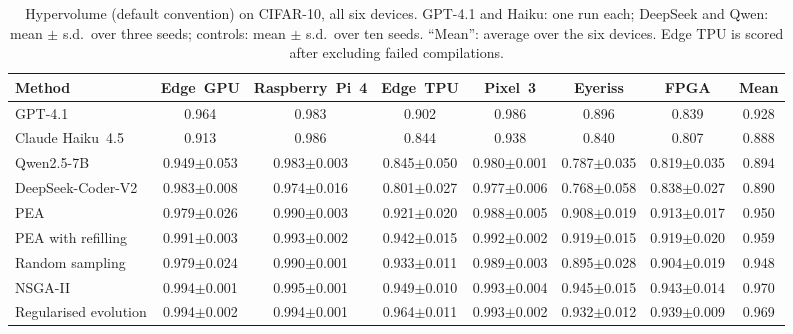 \documentclass[preprint,12pt]{elsarticle}
\begin{document}
\begin{table}[h]\centering\footnotesize
\caption{Hypervolume (default convention) on CIFAR-10, all six devices. GPT-4.1 and Haiku: one run each; DeepSeek and Qwen: mean $\pm$ s.d.\ over three seeds; controls: mean $\pm$ s.d.\ over ten seeds. ``Mean'': average over the six devices. Edge TPU is scored after excluding failed compilations.}\label{tab:multidevice}
\setlength{\tabcolsep}{2.5pt}
\begin{adjustbox}{max width=\linewidth}
\begin{tabular}{lccccccc}
\toprule
Method & Edge~GPU & Raspberry~Pi~4 & Edge~TPU & Pixel~3 & Eyeriss & FPGA & Mean \\
\midrule
GPT-4.1 & 0.964 & 0.983 & 0.902 & 0.986 & 0.896 & 0.839 & 0.928 \\
Claude Haiku~4.5 & 0.913 & 0.986 & 0.844 & 0.938 & 0.840 & 0.807 & 0.888 \\
Qwen2.5-7B & 0.949$\pm$0.053 & 0.983$\pm$0.003 & 0.845$\pm$0.050 & 0.980$\pm$0.001 & 0.787$\pm$0.035 & 0.819$\pm$0.035 & 0.894 \\
DeepSeek-Coder-V2 & 0.983$\pm$0.008 & 0.974$\pm$0.016 & 0.801$\pm$0.027 & 0.977$\pm$0.006 & 0.768$\pm$0.058 & 0.838$\pm$0.027 & 0.890 \\
\midrule
PEA & 0.979$\pm$0.026 & 0.990$\pm$0.003 & 0.921$\pm$0.020 & 0.988$\pm$0.005 & 0.908$\pm$0.019 & 0.913$\pm$0.017 & 0.950 \\
PEA with refilling & 0.991$\pm$0.003 & 0.993$\pm$0.002 & 0.942$\pm$0.015 & 0.992$\pm$0.002 & 0.919$\pm$0.015 & 0.919$\pm$0.020 & 0.959 \\
Random sampling & 0.979$\pm$0.024 & 0.990$\pm$0.001 & 0.933$\pm$0.011 & 0.989$\pm$0.003 & 0.895$\pm$0.028 & 0.904$\pm$0.019 & 0.948 \\
NSGA-II & 0.994$\pm$0.001 & 0.995$\pm$0.001 & 0.949$\pm$0.010 & 0.993$\pm$0.004 & 0.945$\pm$0.015 & 0.943$\pm$0.014 & 0.970 \\
Regularised evolution & 0.994$\pm$0.002 & 0.994$\pm$0.001 & 0.964$\pm$0.011 & 0.993$\pm$0.002 & 0.932$\pm$0.012 & 0.939$\pm$0.009 & 0.969 \\
\bottomrule
\end{tabular}
\end{adjustbox}
\end{table}
\end{document}
